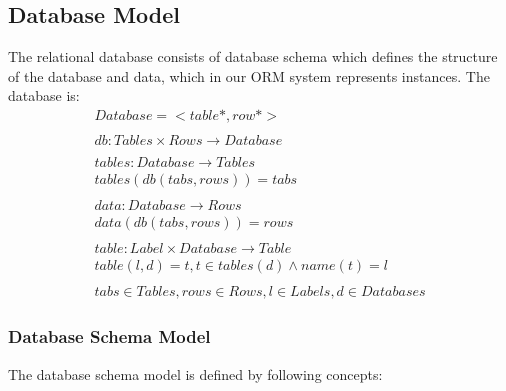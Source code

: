 \documentclass[11pt]{article}
\begin{document}
\subsection{Database Model}
\label{sec:dbModel}
The relational database consists of database schema which defines the structure of the database and data, which in our ORM system represents instances. The database is:
\begin{gather*}
Database = <table*, row*> \\ \\
db : Tables \times Rows \rightarrow Database \\ \\
tables : Database \rightarrow Tables \\
tables(db(tabs, rows)) = tabs \\ \\
data : Database \rightarrow Rows \\
data(db(tabs, rows)) = rows \\ \\
table : Label \times Database \rightarrow Table  \\
table(l, d) = t, t \in tables(d) \wedge name(t) = l \\ \\
tabs \in Tables, rows \in Rows, l \in Labels, d \in Databases
\end{gather*}


\subsubsection{Database Schema Model}
The database schema model is defined by following concepts:
\end{document}
